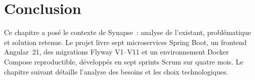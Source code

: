 \section{Conclusion}

Ce chapitre a posé le contexte de Synapse~: analyse de l'existant, problématique et solution retenue. Le projet livre sept microservices Spring Boot, un frontend Angular~21, des migrations Flyway V1--V11 et un environnement Docker Compose reproductible, développés en sept sprints Scrum sur quatre mois. Le chapitre suivant détaille l'analyse des besoins et les choix technologiques.
